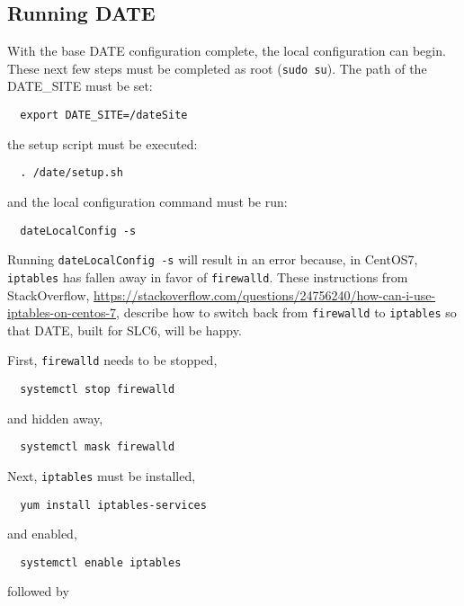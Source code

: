 \documentclass[12pt]{article}
\begin{document}
\subsection{Running DATE}

\qq With the base DATE configuration complete, the local configuration can
begin. These next few steps must be completed as root ({\tt sudo su}). The path
of the DATE\_SITE must be set:

\begin{verbatim}
  export DATE_SITE=/dateSite
\end{verbatim}

the setup script must be executed: 

\begin{verbatim}
  . /date/setup.sh
\end{verbatim}

and the local configuration command must be run: 

\begin{verbatim}
  dateLocalConfig -s
\end{verbatim}

\qq Running {\tt dateLocalConfig -s} will result in an error because, in
CentOS7, {\tt iptables} has fallen away in favor of {\tt firewalld}. These
instructions from StackOverflow,
\url{https://stackoverflow.com/questions/24756240/how-can-i-use-iptables-on-centos-7},
describe how to switch back from {\tt firewalld} to {\tt iptables} so that DATE,
built for SLC6, will be happy.

\qq First, {\tt firewalld} needs to be stopped,

\begin{verbatim}
  systemctl stop firewalld
\end{verbatim}

and hidden away, 

\begin{verbatim}
  systemctl mask firewalld
\end{verbatim}

Next, {\tt iptables} must be installed, 

\begin{verbatim}
  yum install iptables-services
\end{verbatim}

and enabled, 

\begin{verbatim}
  systemctl enable iptables
\end{verbatim}

followed by 
\end{document}
